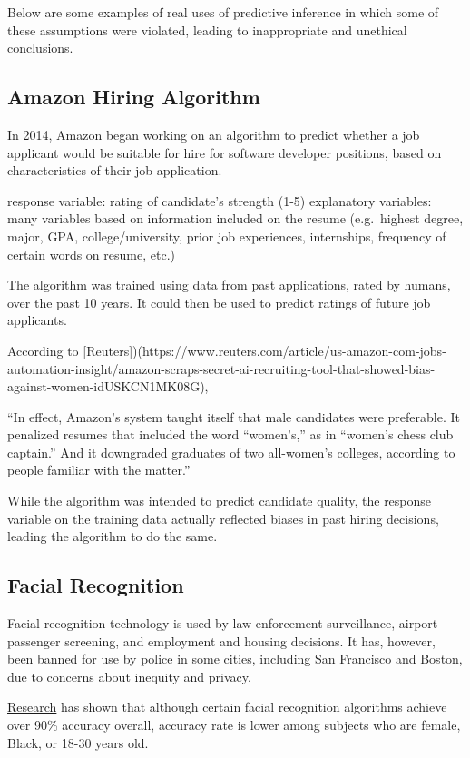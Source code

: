 \documentclass[
  letterpaper,
  DIV=11,
  numbers=noendperiod]{scrreprt}
\begin{document}
Below are some examples of real uses of predictive inference in which
some of these assumptions were violated, leading to inappropriate and
unethical conclusions.

\subsection{Amazon Hiring Algorithm}\label{amazon-hiring-algorithm}

In 2014, Amazon began working on an algorithm to predict whether a job
applicant would be suitable for hire for software developer positions,
based on characteristics of their job application.

response variable: rating of candidate's strength (1-5) explanatory
variables: many variables based on information included on the resume
(e.g.~highest degree, major, GPA, college/university, prior job
experiences, internships, frequency of certain words on resume, etc.)

The algorithm was trained using data from past applications, rated by
humans, over the past 10 years. It could then be used to predict ratings
of future job applicants.

According to
{[}Reuters{]})(https://www.reuters.com/article/us-amazon-com-jobs-automation-insight/amazon-scraps-secret-ai-recruiting-tool-that-showed-bias-against-women-idUSKCN1MK08G),

``In effect, Amazon's system taught itself that male candidates were
preferable. It penalized resumes that included the word ``women's,'' as
in ``women's chess club captain.'' And it downgraded graduates of two
all-women's colleges, according to people familiar with the matter.''

While the algorithm was intended to predict candidate quality, the
response variable on the training data actually reflected biases in past
hiring decisions, leading the algorithm to do the same.

\subsection{Facial Recognition}\label{facial-recognition}

Facial recognition technology is used by law enforcement surveillance,
airport passenger screening, and employment and housing decisions. It
has, however, been banned for use by police in some cities, including
San Francisco and Boston, due to concerns about inequity and privacy.

\href{https://sitn.hms.harvard.edu/flash/2020/racial-discrimination-in-face-recognition-technology/}{Research}
has shown that although certain facial recognition algorithms achieve
over 90\% accuracy overall, accuracy rate is lower among subjects who
are female, Black, or 18-30 years old.
\end{document}
